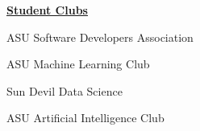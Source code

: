 \documentclass[a4paper]{article}
\begin{document}
\begin{center}
\underline{\textbf{Student Clubs}}
\end{center}

\begin{center}
    

\begin{itemize*}
    \item ASU Software Developers Association
    \item ASU Machine Learning Club
    \item Sun Devil Data Science               
    \item ASU Artificial Intelligence Club


\end{itemize*}
\end{center}

\vspace{-20mm}
    


\ 
\end{document}
